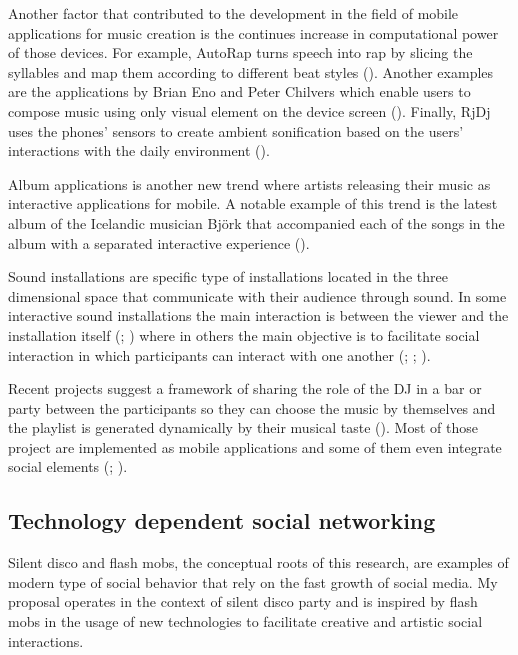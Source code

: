 \documentclass[a4paper,11pt]{article}
\begin{document}
Another factor that contributed to the development in the field of mobile applications for music creation is the continues increase in computational power of those devices.
For example, AutoRap turns speech into rap by slicing the syllables and map them according to different beat styles (\citeauthor{web:autorap}).
Another examples are the applications by Brian Eno and Peter Chilvers which enable users to compose music using only visual element on the device screen (\citeauthor{web:generativemusic}).
Finally, RjDj uses the phones' sensors to create ambient sonification based on the users' interactions with the daily environment (\cite{web:rjdj})\label{rjdj}.

Album applications is another new trend where artists releasing their music as interactive applications for mobile.
A notable example of this trend is the latest album of the Icelandic musician Bj\"{o}rk that accompanied each of the songs in the album with a separated interactive experience (\cite{stimulant13}).

Sound installations are specific type of installations located in the three dimensional space that communicate with their audience through sound.
In some interactive sound installations the main interaction is between the viewer and the installation itself (\cite{web:visnjic}; \cite{web:cardiff01}) where in others the main objective is to facilitate social interaction in which participants can interact with one another (\cite{eng03}; \cite{web:kirn12}; \cite{web:murray-browne13}).

Recent projects suggest a framework of sharing the role of the DJ in a bar or party between the participants so they can choose the music by themselves and the playlist is generated dynamically by their musical taste (\cite{web:shaw}).
Most of those project are implemented as mobile applications and some of them even integrate social elements (\citeauthor{web:playmysong}; \cite{web:lammers}).

\subsection{Technology dependent social networking}

Silent disco and flash mobs, the conceptual roots of this research, are examples of modern type of social behavior that rely on the fast growth of social media.
My proposal operates in the context of silent disco party and is inspired by flash mobs in the usage of new technologies to facilitate creative and artistic social interactions.
\end{document}
